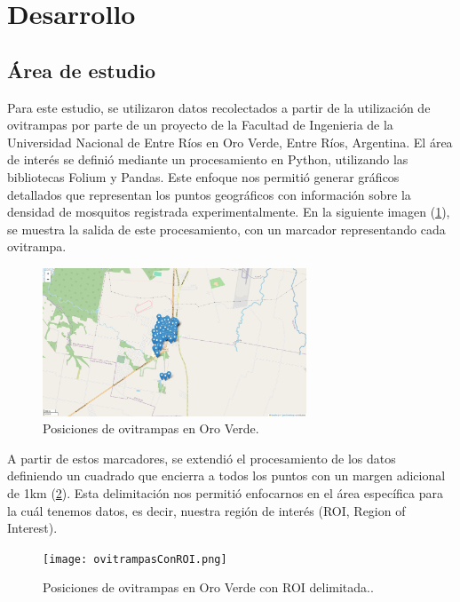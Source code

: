 

\section{Desarrollo}

\subsection{Área de estudio}

Para este estudio, se utilizaron datos recolectados a partir de la utilización de ovitrampas por parte de un proyecto de la Facultad de Ingenieria de la Universidad Nacional de Entre Ríos en Oro Verde, Entre Ríos, Argentina. El área de interés se definió mediante un procesamiento en Python, utilizando las bibliotecas Folium y Pandas. Este enfoque nos permitió generar gráficos detallados que representan los puntos geográficos con información sobre la densidad de mosquitos registrada experimentalmente. En la siguiente imagen (\figurename \ref{fig:ovitrampas}), se muestra la salida de este procesamiento, con un marcador representando cada ovitrampa.
	
\begin{figure}[H]
	\includegraphics[width=0.7\textwidth]{ovitrampas.png}
	\centering
	\caption{Posiciones de ovitrampas en Oro Verde.}
	\label{fig:ovitrampas}
	
\end{figure}

A partir de estos marcadores, se extendió el procesamiento de los datos definiendo un cuadrado que encierra a todos los puntos con un margen adicional de 1km (\figurename \ref{fig:ovitrampas-ROI}). Esta delimitación nos permitió enfocarnos en el área específica para la cuál tenemos datos, es decir, nuestra región de interés (ROI, Region of Interest).

\begin{figure}[H]
	\texttt{[image: ovitrampasConROI.png]}
	\centering
	\caption{Posiciones de ovitrampas en Oro Verde con ROI delimitada..}
	\label{fig:ovitrampas-ROI}
	
\end{figure}

